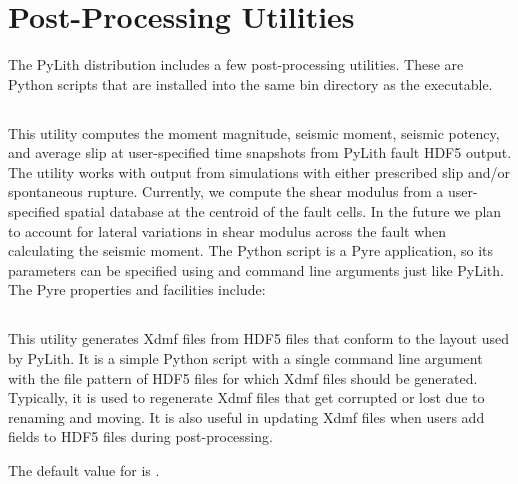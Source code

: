 \section{Post-Processing Utilities}

The PyLith distribution includes a few post-processing utilities.
These are Python scripts that are installed into the same bin directory
as the  executable.


\subsection{}

This utility computes the moment magnitude, seismic moment, seismic
potency, and average slip at user-specified time snapshots from PyLith
fault HDF5 output. The utility works with output from simulations
with either prescribed slip and/or spontaneous rupture. Currently,
we compute the shear modulus from a user-specified spatial database
at the centroid of the fault cells. In the future we plan to account
for lateral variations in shear modulus across the fault when calculating
the seismic moment. The Python script is a Pyre application, so its
parameters can be specified using  and command line arguments
just like PyLith. The Pyre properties and facilities include:
\begin{inventory}
\end{inventory}

\subsection{}
\label{sec:pylith:genxdmf}

This utility generates Xdmf files from HDF5 files that conform to the
layout used by PyLith. It is a simple Python script with a single
command line argument with the file pattern of HDF5 files for which
Xdmf files should be generated. Typically, it is used to regenerate
Xdmf files that get corrupted or lost due to renaming and moving. It
is also useful in updating Xdmf files when users add fields to HDF5
files during post-processing.
The default value for  is .

